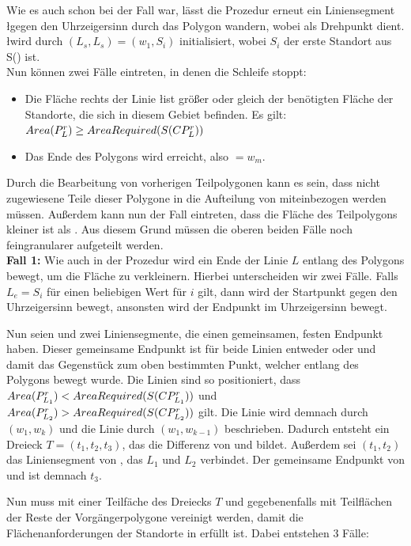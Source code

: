 \documentclass[ngerman]{seminarbeitrag}
\begin{document}
Wie es auch schon bei \con der Fall war, lässt die Prozedur erneut ein Liniensegment \l gegen den Uhrzeigersinn durch das Polygon \cpi wandern, wobei \ls als Drehpunkt dient. \l wird durch $(L_{s}, L_{s}) = (w_{1}, S_{i})$ initialisiert, wobei $S_{i}$ der erste Standort aus S(\cpi) ist.\\
Nun können zwei Fälle eintreten, in denen die Schleife stoppt:

\begin{itemize}
\item Die Fläche rechts der Linie \l ist größer oder gleich der benötigten Fläche der Standorte, die sich in diesem Gebiet befinden. Es gilt:
$Area(P_{L}^{r})\ge AreaRequired(S(CP_{L}^{r}))$
\item Das Ende des Polygons wird erreicht, also \Le $= w_{m}$.
\end{itemize}

Durch die Bearbeitung von vorherigen Teilpolygonen kann es sein, dass nicht zugewiesene Teile dieser Polygone in die Aufteilung von \cpi miteinbezogen werden müssen. Außerdem kann nun der Fall eintreten, dass die Fläche des Teilpolygons kleiner ist als . Aus diesem Grund müssen die oberen beiden Fälle noch feingranularer aufgeteilt werden.\\

\textbf{Fall 1:} Wie auch in der Prozedur \con wird ein Ende der Linie $L$ entlang des Polygons bewegt, um die Fläche \ar{\mprl} zu verkleinern. Hierbei unterscheiden wir zwei Fälle. Falls $L_{e} = S_{i}$ für einen beliebigen Wert für $i$ gilt, dann wird der Startpunkt \ls gegen den Uhrzeigersinn bewegt, ansonsten wird der Endpunkt \Le im Uhrzeigersinn bewegt.

Nun seien \leins und \lzwei zwei Liniensegmente, die einen gemeinsamen, festen Endpunkt haben. Dieser gemeinsame Endpunkt ist für beide Linien entweder \ls oder \Le und damit das Gegenstück zum oben bestimmten Punkt, welcher entlang des Polygons bewegt wurde. Die Linien sind so positioniert, dass $Area(P^{r}_{L_{1}}) < AreaRequired(S(CP^{r}_{L_{1}}))$ und $Area(P^{r}_{L_{2}}) > AreaRequired(S(CP^{r}_{L_{2}}))$ gilt. Die Linie \lzwei wird demnach durch $(w_{1}, w_{k})$ und die Linie \leins durch $(w_{1}, w_{k-1})$ beschrieben.
Dadurch entsteht ein Dreieck $T = (t_{1}, t_{2}, t_{3})$, das die Differenz von \cprleins und \cprlzwei bildet. Außerdem sei $(t_{1}, t_{2})$ das Liniensegment von \cpi, das $L_{1}$ und $L_{2}$ verbindet. Der gemeinsame Endpunkt von \leins und \lzwei ist demnach $t_{3}$.

Nun muss \cprleins mit einer Teilfäche des Dreiecks $T$ und gegebenenfalls mit Teilflächen der Reste der Vorgängerpolygone vereinigt werden, damit die Flächenanforderungen der Standorte in \cprleins erfüllt ist. Dabei entstehen 3 Fälle:
\end{document}
